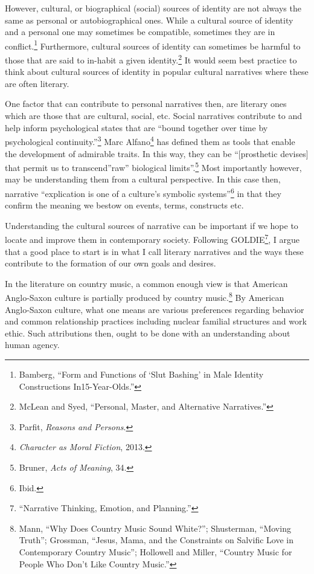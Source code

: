 \documentclass[phdthesis,12pt,final]{wuthesis}
\theoremstyle{definition}
\theoremstyle{definition}
\theoremstyle{definition}
\theoremstyle{definition}
\theoremstyle{remark}
\begin{document}
However, cultural, or biographical (social) sources of identity are not always the same as personal or autobiographical ones. While a cultural source of identity and a personal one may sometimes be compatible, sometimes they are in conflict.\footnote{Bamberg, {``Form and {Functions} of {`{Slut Bashing}'} in {Male Identity Constructions} In15-{Year-Olds}.''}} Furthermore, cultural sources of identity can sometimes be harmful to those that are said to in-habit a given identity.\footnote{McLean and Syed, {``Personal, {Master}, and {Alternative Narratives}.''}} It would seem best practice to think about cultural sources of identity in popular cultural narratives where these are often literary.

One factor that can contribute to personal narratives then, are literary ones which are those that are cultural, social, etc. Social narratives contribute to and help inform psychological states that are ``bound together over time by psychological continuity.''\footnote{Parfit, \emph{Reasons and Persons}.} Marc Alfano\footnote{\emph{Character as Moral Fiction}, 2013.} has defined them as tools that enable the development of admirable traits. In this way, they can be ``{[}prosthetic devises{]} that permit us to transcend''raw'' biological limits''.\footnote{Bruner, \emph{Acts of Meaning}, 34.} Most importantly however, may be understanding them from a cultural perspective. In this case then, narrative ``explication is one of a culture's symbolic systems''\footnote{Ibid.} in that they confirm the meaning we bestow on events, terms, constructs etc.

Understanding the cultural sources of narrative can be important if we hope to locate and improve them in contemporary society. Following GOLDIE\footnote{{``Narrative {Thinking}, {Emotion}, and {Planning}.''}}, I argue that a good place to start is in what I call literary narratives and the ways these contribute to the formation of our own goals and desires.

In the literature on country music, a common enough view is that American Anglo-Saxon culture is partially produced by country music.\footnote{Mann, {``Why Does Country Music Sound White?''}; Shusterman, {``Moving {Truth}''}; Grossman, {``Jesus, {Mama}, and the {Constraints} on {Salvific Love} in {Contemporary Country Music}''}; Hollowell and Miller, {``Country {Music} for {People Who Don}'t {Like Country Music}.''}} By American Anglo-Saxon culture, what one means are various preferences regarding behavior and common relationship practices including nuclear familial structures and work ethic. Such attributions then, ought to be done with an understanding about human agency.
\end{document}
